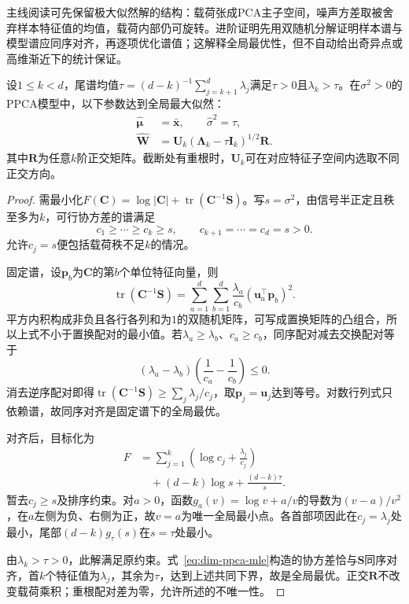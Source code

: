 主线阅读可先保留极大似然解的结构：载荷张成PCA主子空间，噪声方差取被舍弃样本特征值的均值，载荷内部仍可旋转。进阶证明先用双随机分解证明样本谱与模型谱应同序对齐，再逐项优化谱值；这解释全局最优性，但不自动给出奇异点或高维渐近下的统计保证。

\begin{theorem}[PPCA的极大似然解]
\label{thm:dim-ppca-mle}
设$1\leq k<d$，尾谱均值$\tau=(d-k)^{-1}\sum_{j=k+1}^d\lambda_j$满足$\tau>0$且$\lambda_k>\tau$。在$\sigma^2>0$的PPCA模型中，以下参数达到全局最大似然：
\begin{equation}
\label{eq:dim-ppca-mle}
\begin{aligned}
\hat{\bm{\mu}}&=\bar{\bm{x}},\qquad
\hat{\sigma}^2=\tau,\\
\hat{\bm{W}}&=\bm{U}_k(\bm{\Lambda}_k-\tau\bm{I}_k)^{1/2}\bm{R}.
\end{aligned}
\end{equation}
其中$\bm{R}$为任意$k$阶正交矩阵。截断处有重根时，$\bm{U}_k$可在对应特征子空间内选取不同正交方向。
\end{theorem}

\begin{proof}
需最小化$F(\bm{C})=\log|\bm{C}|+\operatorname{tr}(\bm{C}^{-1}\bm{S})$。写$s=\sigma^2$，由信号半正定且秩至多为$k$，可行协方差的谱满足
\[
c_1\geq\cdots\geq c_k\geq s,\qquad
c_{k+1}=\cdots=c_d=s>0.
\]
允许$c_j=s$便包括载荷秩不足$k$的情况。

固定谱，设$\bm{p}_b$为$\bm{C}$的第$b$个单位特征向量，则
\[
\operatorname{tr}(\bm{C}^{-1}\bm{S})
=\sum_{a=1}^d\sum_{b=1}^d
\frac{\lambda_a}{c_b}(\bm{u}_a^\top\bm{p}_b)^2.
\]
平方内积构成非负且各行各列和为$1$的双随机矩阵，可写成置换矩阵的凸组合，所以上式不小于置换配对的最小值。若$\lambda_a\geq\lambda_b$、$c_a\geq c_b$，同序配对减去交换配对等于
\[
(\lambda_a-\lambda_b)
\left(\frac{1}{c_a}-\frac{1}{c_b}\right)\leq0.
\]
消去逆序配对即得$\operatorname{tr}(\bm{C}^{-1}\bm{S})\geq\sum_j\lambda_j/c_j$，取$\bm{p}_j=\bm{u}_j$达到等号。对数行列式只依赖谱，故同序对齐是固定谱下的全局最优。

对齐后，目标化为
\[
\begin{aligned}
F&=\sum_{j=1}^k\left(\log c_j+\frac{\lambda_j}{c_j}\right)\\
&\quad+(d-k)\log s+\frac{(d-k)\tau}{s}.
\end{aligned}
\]
暂去$c_j\geq s$及排序约束。对$a>0$，函数$g_a(v)=\log v+a/v$的导数为$(v-a)/v^2$，在$a$左侧为负、右侧为正，故$v=a$为唯一全局最小点。各首部项因此在$c_j=\lambda_j$处最小，尾部$(d-k)g_\tau(s)$在$s=\tau$处最小。

由$\lambda_k>\tau>0$，此解满足原约束。式~\eqref{eq:dim-ppca-mle}构造的协方差恰与$\bm{S}$同序对齐，首$k$个特征值为$\lambda_j$，其余为$\tau$，达到上述共同下界，故是全局最优。正交$\bm{R}$不改变载荷乘积；重根配对差为零，允许所述的不唯一性。
\end{proof}

